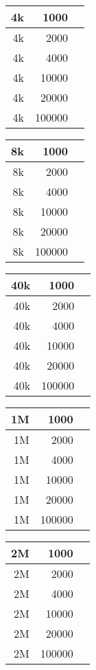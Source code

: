 \documentclass[a4paper,8pt]{scrartcl}
\begin{document}
\begin{tabular}{|r||r||r|}
  \hline
  4k & 1000 & \\
  \hline
  4k & 2000 &\\
  \hline
  4k & 4000 &\\
  \hline
  4k & 10000 &\\
  \hline
  4k & 20000 &\\
  \hline
  4k & 100000 &\\
  \hline
\end{tabular}

\begin{tabular}{|r||r||r|}
  \hline
  8k & 1000 & \\
  \hline
  8k & 2000 &\\
  \hline
  8k & 4000 &\\
  \hline
  8k & 10000 &\\
  \hline
  8k & 20000 &\\
  \hline
  8k & 100000 &\\
  \hline
\end{tabular}

\begin{tabular}{|r||r||r|}
  \hline
  40k & 1000 & \\
  \hline
  40k & 2000 &\\
  \hline
  40k & 4000 &\\
  \hline
  40k & 10000 &\\
  \hline
  40k & 20000 &\\
  \hline
  40k & 100000 &\\
  \hline
\end{tabular}

\begin{tabular}{|r||r||r|}
  \hline
  1M & 1000 & \\
  \hline
  1M & 2000 &\\
  \hline
  1M & 4000 &\\
  \hline
  1M & 10000 &\\
  \hline
  1M & 20000 &\\
  \hline
  1M & 100000 &\\
  \hline
\end{tabular}

\begin{tabular}{|r||r||r|}
  \hline
  2M & 1000 & \\
  \hline
  2M & 2000 &\\
  \hline
  2M & 4000 &\\
  \hline
  2M & 10000 &\\
  \hline
  2M & 20000 &\\
  \hline
  2M & 100000 &\\
  \hline
\end{tabular}
\end{document}
